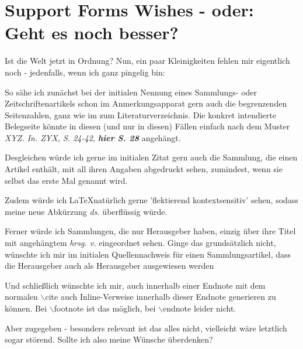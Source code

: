 %
%
%
%
\section{Support Forms Wishes - oder: Geht es noch besser?}
Ist die Welt jetzt in Ordnung? Nun, ein paar Kleinigkeiten fehlen mir
eigentlich noch - jedenfalls, wenn ich ganz pingelig bin:

So sähe ich zunächst bei der initialen Nennung eines Sammlungs- oder
Zeitschriftenartikels schon im Anmerkungsapparat gern auch die begrenzenden
Seitenzahlen, ganz wie im zum Literaturverzeichnis. Die konkret
intendierte Belegseite könnte in diesen (und nur in diesen) Fällen einfach nach
dem Muster {\itshape XYZ. In. ZYX, S. 24-42, {\bfseries hier S. 28}} angehängt.

Desgleichen würde ich gerne im initialen Zitat gern auch die Sammlung, die einen
Artikel enthält, mit all ihren Angaben abgedruckt sehen, zumindest, wenn sie
selbst das erste Mal genannt wird.

Zudem würde ich \LaTeX natürlich gerne 'flektierend kontextsensitiv'
sehen, sodass meine neue Abkürzung {\itshape ds.} überflüssig würde.

Ferner würde ich Sammlungen, die nur Herausgeber haben, einzig über ihre Titel
mit angehängtem {\itshape hrsg. v.} eingeordnet sehen. Ginge das grundsätzlich
nicht, wünschte ich mir im initialen Quellennachweis für einen Sammlungsartikel,
dass die Herausgeber auch als Herausgeber ausgewiesen werden 

Und schließlich wünschte ich mir, auch innerhalb einer Endnote mit dem normalen
$\backslash$cite auch Inline-Verweise innerhalb dieser Endnote generieren zu
können. Bei $\backslash$footnote ist das möglich, bei $\backslash$endnote leider
nicht.

Aber zugegeben - besonders relevant ist das alles nicht, vielleicht wäre
letztlich sogar störend. Sollte ich also meine Wünsche überdenken?

%
